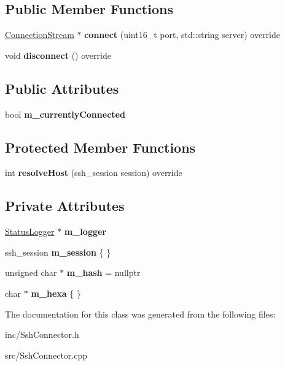 \subsection*{Public Member Functions}
\begin{DoxyCompactItemize}
\item 
\mbox{\label{classSshConnector_aeb1020e975caa51b24b49180362bf916}} 
\hyperlink{classConnectionStream}{Connection\+Stream} $\ast$ {\bfseries connect} (uint16\+\_\+t port, std\+::string server) override
\item 
\mbox{\label{classSshConnector_a54af419fdb2ec6ffa7aad86b294da681}} 
void {\bfseries disconnect} () override
\end{DoxyCompactItemize}
\subsection*{Public Attributes}
\begin{DoxyCompactItemize}
\item 
\mbox{\label{classSshConnector_ac31406197a9f7313f07945d85939ea31}} 
bool {\bfseries m\+\_\+currently\+Connected}
\end{DoxyCompactItemize}
\subsection*{Protected Member Functions}
\begin{DoxyCompactItemize}
\item 
\mbox{\label{classSshConnector_a1d56102ea6b4fa9b632b4a09a82b1384}} 
int {\bfseries resolve\+Host} (ssh\+\_\+session session) override
\end{DoxyCompactItemize}
\subsection*{Private Attributes}
\begin{DoxyCompactItemize}
\item 
\mbox{\label{classSshConnector_a50ffdb805cbc4b2cafb11d83b3858095}} 
\hyperlink{classStatusLogger}{Status\+Logger} $\ast$ {\bfseries m\+\_\+logger}
\item 
\mbox{\label{classSshConnector_ae66617dc5bb646d9de70adfae28eccd5}} 
ssh\+\_\+session {\bfseries m\+\_\+session} \{ \}
\item 
\mbox{\label{classSshConnector_a24af12d393d809a47c750ad3be02bbad}} 
unsigned char $\ast$ {\bfseries m\+\_\+hash} = nullptr
\item 
\mbox{\label{classSshConnector_a7d02d2d3bfad85572058d354d6fc59c9}} 
char $\ast$ {\bfseries m\+\_\+hexa} \{ \}
\end{DoxyCompactItemize}


The documentation for this class was generated from the following files\+:\begin{DoxyCompactItemize}
\item 
inc/Ssh\+Connector.\+h\item 
src/Ssh\+Connector.\+cpp\end{DoxyCompactItemize}
